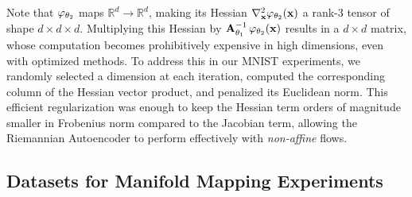 
Note that \(\varphi_{\theta_2}\) maps \(\mathbb{R}^d \to \mathbb{R}^d\), making its Hessian \(\nabla_{\mathbf{x}}^2 \varphi_{\theta_2}(\mathbf{x})\) a rank-3 tensor of shape \(d \times d \times d\). Multiplying this Hessian by \(\mathbf{A}_{\theta_1}^{-1}\,\varphi_{\theta_2}(\mathbf{x})\) results in a \(d \times d\) matrix, whose computation becomes prohibitively expensive in high dimensions, even with optimized methods. To address this in our MNIST experiments, we randomly selected a dimension at each iteration, computed the corresponding column of the Hessian vector product, and penalized its Euclidean norm. This efficient regularization was enough to keep the Hessian term orders of magnitude smaller in Frobenius norm compared to the Jacobian term, allowing the Riemannian Autoencoder to perform effectively with \textit{non-affine} flows.
\subsection{Datasets for Manifold Mapping Experiments}
\label{app:manifold_mapping}


